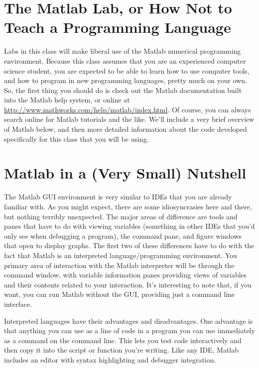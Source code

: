 
\section{The Matlab Lab, or How Not to Teach a Programming Language}

Labs in this class will make liberal use of the Matlab numerical
programming environment. Because this class assumes that you are an
experienced computer science student, you are expected to be able to
learn how to use computer tools, and how to program in new programming
languages, pretty much on your own. So, the first thing you should do
is check out the Matlab documentation built into the Matlab help
system, or online at
\url{http://www.mathworks.com/help/matlab/index.html}. Of course, you
can always search online for Matlab tutorials and the like. We'll
include a very brief overview of Matlab below, and then more detailed
information about the code developed specifically for this class that
you will be using.

\section{Matlab in a (Very Small) Nutshell}
\label{sc:basic-matlab}

The Matlab GUI environment is very similar to IDEs that you are
already familiar with. As you might expect, there are some
idiosyncrasies here and there, but nothing terribly unexpected. The
major areas of difference are tools and panes that have to do with
viewing variables (something in other IDEs that you'd only see when
debugging a program), the command pane, and figure windows that open
to display graphs. The first two of these differences have to do with
the fact that Matlab is an interpreted language/programming
environment. You primary area of interaction with the Matlab
interpreter will be through the command window, with variable
information panes providing views of variables and their contents
related to your interaction. It's interesting to note that, if you
want, you can run Matlab without the GUI, providing just a command
line interface.

Interpreted languages have their advantages and disadvantages.  One
advantage is that anything you can use as a line of code in a program
you can use immediately as a command on the command line. This lets
you test code interactively and then copy it into the script or
function you're writing. Like any IDE, Matlab includes an editor with
syntax highlighting and debugger integration.

